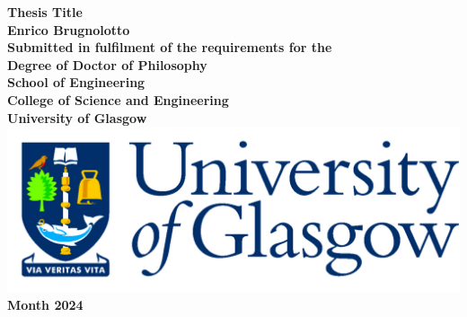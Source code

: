 \documentclass[12pt,titlepage,oneside]{book} %
\begin{document}
\begin{titlepage}
\centering
\vspace*{3cm}  %
\bfseries\Large
Thesis Title\\
\vspace{3cm}
\normalfont\large
Enrico Brugnolotto\\
\vspace{2cm}
Submitted in fulfilment of the requirements for the\\
Degree of Doctor of Philosophy\\
\vspace{2cm}
School of Engineering\\
College of Science and Engineering\\
University of Glasgow\\
\vspace{1cm}
\includegraphics[scale=0.125]{GlaLogo.pdf}
\\
\vspace{1cm}
Month 2024
\end{titlepage}
\frontmatter  %
%
\tableofcontents
\listoftables
\listoffigures
\printglossaries
%
%

\mainmatter %

%
%
%

%
%

\appendix
%
%

\backmatter  %

\printbibliography
\end{document}
